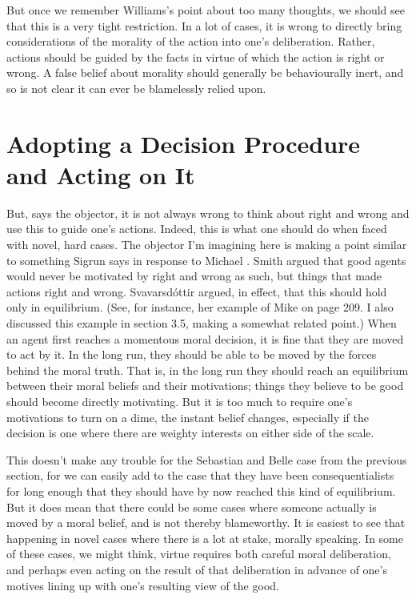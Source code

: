 But once we remember Williams's point about too many thoughts, we should see that this is a very tight restriction. In a lot of cases, it is wrong to directly bring considerations of the morality of the action into one's deliberation. Rather, actions should be guided by the facts in virtue of which the action is right or wrong. A false belief about morality should generally be behaviourally inert, and so is not clear it can ever be blamelessly relied upon.

\section{Adopting a Decision Procedure and Acting on It}
\label{adoptingadecisionprocedureandactingonit}

But, says the objector, it is not always wrong to think about right and wrong and use this to guide one's actions. Indeed, this is what one should do when faced with novel, hard cases. The objector I'm imagining here is making a point similar to something Sigrun \citet{Svavarsdottir1999} says in response to Michael \citet{Smith1994}. Smith argued that good agents would never be motivated by right and wrong as such, but things that made actions right and wrong. Svavarsdóttir argued, in effect, that this should hold only in equilibrium. (See, for instance, her example of Mike on page 209. I also discussed this example in section 3.5, making a somewhat related point.) When an agent first reaches a momentous moral decision, it is fine that they are moved to act by it. In the long run, they should be able to be moved by the forces behind the moral truth. That is, in the long run they should reach an equilibrium between their moral beliefs and their motivations; things they believe to be good should become directly motivating. But it is too much to require one's motivations to turn on a dime, the instant belief changes, especially if the decision is one where there are weighty interests on either side of the scale.

This doesn't make any trouble for the \gls{Sebastian} and \gls{Belle} case from the previous section, for we can easily add to the case that they have been consequentialists for long enough that they should have by now reached this kind of equilibrium. But it does mean that there could be some cases where someone actually is moved by a moral belief, and is not thereby blameworthy. It is easiest to see that happening in novel cases where there is a lot at stake, morally speaking. In some of these cases, we might think, virtue requires both careful moral deliberation, and perhaps even acting on the result of that deliberation in advance of one's motives lining up with one's resulting view of the good.

